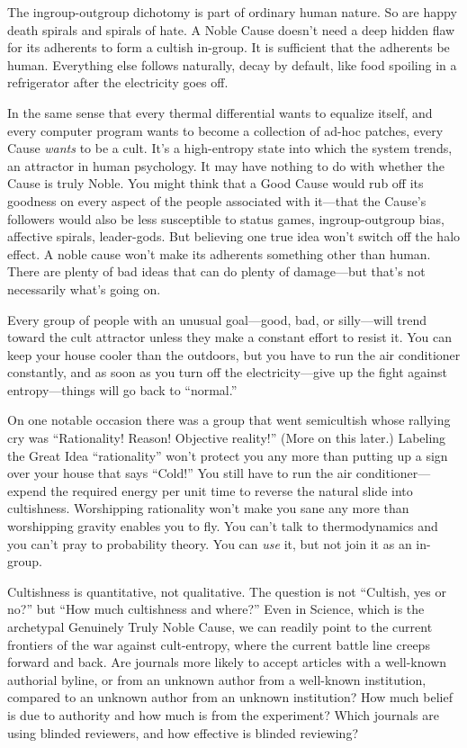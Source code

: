 {
 The ingroup-outgroup dichotomy is part of ordinary human nature.
So are happy death spirals and spirals of hate. A Noble Cause
doesn't need a deep hidden flaw for its adherents to
form a cultish in-group. It is sufficient that the adherents be human.
Everything else follows naturally, decay by default, like food spoiling
in a refrigerator after the electricity goes off.}

{
 In the same sense that every thermal differential wants to
equalize itself, and every computer program wants to become a
collection of ad-hoc patches, every Cause \textit{wants} to be a cult.
It's a high-entropy state into which the system trends,
an attractor in human psychology. It may have nothing to do with
whether the Cause is truly Noble. You might think that a Good Cause
would rub off its goodness on every aspect of the people associated
with it---that the Cause's followers would also be less
susceptible to status games, ingroup-outgroup bias, affective spirals,
leader-gods. But believing one true idea won't switch
off the halo effect. A noble cause won't make its
adherents something other than human. There are plenty of bad ideas
that can do plenty of damage---but that's not
necessarily what's going on.}

{
 Every group of people with an unusual goal---good, bad, or
silly---will trend toward the cult attractor unless they make a
constant effort to resist it. You can keep your house cooler than the
outdoors, but you have to run the air conditioner constantly, and as
soon as you turn off the electricity---give up the fight against
entropy---things will go back to
``normal.''}

{
 On one notable occasion there was a group that went semicultish
whose rallying cry was ``Rationality! Reason!
Objective reality!'' (More on this later.) Labeling
the Great Idea ``rationality''
won't protect you any more than putting up a sign over
your house that says ``Cold!'' You
still have to run the air conditioner---expend the required energy per
unit time to reverse the natural slide into cultishness. Worshipping
rationality won't make you sane any more than
worshipping gravity enables you to fly. You can't talk
to thermodynamics and you can't pray to probability
theory. You can \textit{use} it, but not join it as an in-group.}

{
 Cultishness is quantitative, not qualitative. The question is not
``Cultish, yes or no?'' but
``How much cultishness and where?''
Even in Science, which is the archetypal Genuinely Truly Noble Cause,
we can readily point to the current frontiers of the war against
cult-entropy, where the current battle line creeps forward and back.
Are journals more likely to accept articles with a well-known authorial
byline, or from an unknown author from a well-known institution,
compared to an unknown author from an unknown institution? How much
belief is due to authority and how much is from the experiment? Which
journals are using blinded reviewers, and how effective is blinded
reviewing?}

